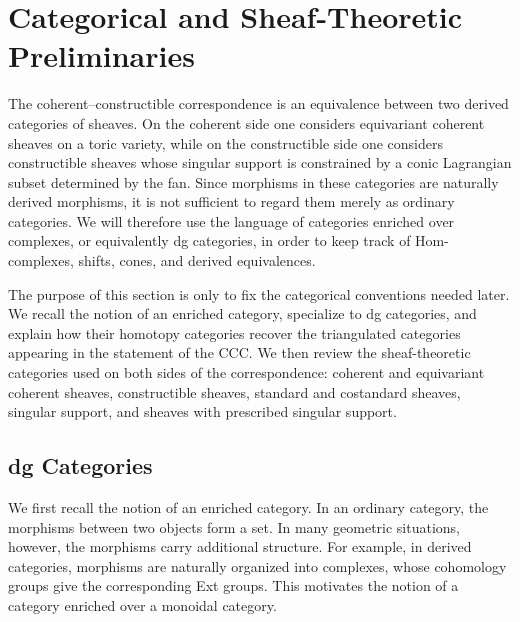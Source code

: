 {\begingroup



\section{Categorical and Sheaf-Theoretic Preliminaries}

The coherent--constructible correspondence is an equivalence between
two derived categories of sheaves.  On the coherent side one considers
equivariant coherent sheaves on a toric variety, while on the
constructible side one considers constructible sheaves whose singular
support is constrained by a conic Lagrangian subset determined by the
fan.  Since morphisms in these categories are naturally derived
morphisms, it is not sufficient to regard them merely as ordinary
categories.  We will therefore use the language of categories enriched
over complexes, or equivalently dg categories, in order to keep track of
Hom-complexes, shifts, cones, and derived equivalences.

The purpose of this section is only to fix the categorical conventions
needed later.  We recall the notion of an enriched category, specialize
to dg categories, and explain how their homotopy categories recover the
triangulated categories appearing in the statement of the CCC.  We then
review the sheaf-theoretic categories used on both sides of the
correspondence: coherent and equivariant coherent sheaves, constructible
sheaves, standard and costandard sheaves, singular support, and sheaves
with prescribed singular support.

\subsection{dg Categories}

We first recall the notion of an enriched category.  In an ordinary
category, the morphisms between two objects form a set.  In many
geometric situations, however, the morphisms carry additional structure.
For example, in derived categories, morphisms are naturally organized
into complexes, whose cohomology groups give the corresponding Ext
groups.  This motivates the notion of a category enriched over a
monoidal category.

}
